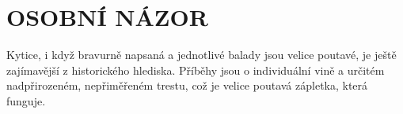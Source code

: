 \documentclass{extarticle} %
\begin{document}





\section*{OSOBNÍ NÁZOR}
\noindent 
Kytice, i když bravurně napsaná a jednotlivé balady jsou velice poutavé, je ještě zajímavější z historického hlediska. Příběhy jsou o individuální vině a určitém nadpřirozeném, nepřiměřeném trestu, což je velice poutavá zápletka, která funguje.

\vfill
\end{document}
